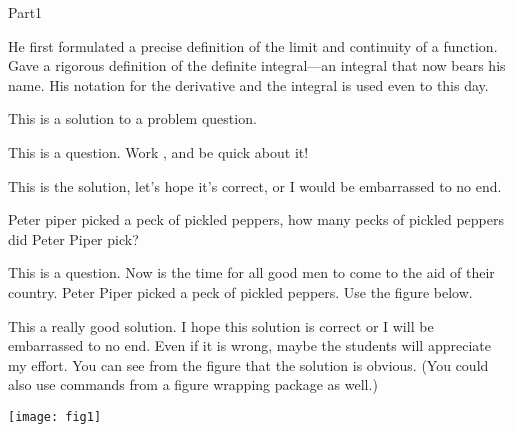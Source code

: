 \documentclass[10pt]{article}
\begin{document}
\begin{exam}[Part I.]{Part1}
\begin{problem}[5]
\begin{multicols}{2}
\begin{answers}{1}
 He first formulated a precise definition of the limit
and continuity of a function.  %
 Gave a rigorous definition of the definite integral---an
integral that now bears his name.  %
 His notation for the derivative and the integral is used
even to this day. %

\end{answers}
\end{multicols}


\begin{solution}
This is a solution to a problem question.
\end{solution}

\end{problem}

\begin{problem}[3]
This is a question.  Work \OnBackOfPage, and be quick about it!

\begin{solution}[1in]
This is the solution, let's hope it's correct, or I would be embarrassed to no end.
\end{solution}
%
%
\begin{workarea}[.5\linewidth]{1in}
Peter piper picked a peck of pickled peppers, how many pecks of pickled
peppers did Peter Piper pick?
%
\vfill\hfill\setlength{\fboxsep}{6pt}
\end{workarea}
\end{problem}

\begin{problem}[7]
This is a question. Now is the time for all good men to come to
the aid of their country. Peter Piper picked a peck of pickled
peppers. Use the figure below.


\begin{solution}[1in]
This a really good  solution. I hope this solution is correct or I will be
embarrassed to no end. Even if it is wrong, maybe the students will appreciate
my effort. You can see from the figure that the solution is obvious.
(You could also use commands from a figure wrapping package as well.)
\end{solution}
\begin{workarea}[\linewidth]{1in}
\hfill\texttt{[image: fig1]}
\end{workarea}
\end{problem}


\end{exam}
\end{document}
